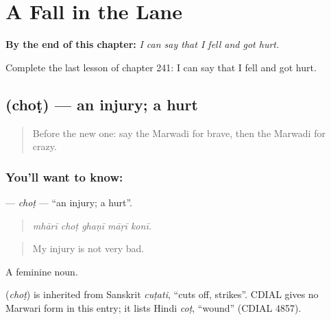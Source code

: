 
\chapter{A Fall in the Lane}
\label{ch:mw-a-fall-in-the-lane}

\begin{chapteropening}
\textbf{By the end of this chapter:} \emph{I can say that I fell and got hurt.}

Complete the last lesson of chapter 241: I can say that I fell and got hurt.
\end{chapteropening}

\section[\texorpdfstring{\mw{चोट} (choṭ)}{चोट (choṭ)}]{ (choṭ) — an injury; a hurt}

\label{lesson:MW-C241-chot}



\begin{quote}
Before the new one: say the Marwadi for brave, then the Marwadi for crazy.
\end{quote}

\subsection*{You'll want to know: }
\textbf{} — \emph{choṭ} — \textquotedblleft{}an injury; a hurt\textquotedblright{}.

\begin{quote}
    
\end{quote}

\begin{quote}
\emph{mhārī choṭ ghaṇī māṛī konī.}
\end{quote}

\begin{quote}
My injury is not very bad.
\end{quote}

A feminine noun.

\begin{cousinweb}
\textbf{} (\emph{choṭ}) is inherited from Sanskrit \emph{cuṭati}, \textquotedblleft{}cuts off, strikes\textquotedblright{}. CDIAL gives no Marwari form in this entry; it lists Hindi \emph{coṭ}, \textquotedblleft{}wound\textquotedblright{} (CDIAL 4857).
\end{cousinweb}

